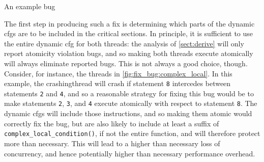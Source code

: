 \begin{sanefig}
  \hspace{-5mm}
  \hspace{-10mm}
  \caption{An example bug}
  \label{fig:fix_bug:complex_local}
\end{sanefig}

The first step in producing such a fix is determining which parts of
the dynamic \glspl{cfg} are to be included in the critical sections.
In principle, it is sufficient to use the entire dynamic \gls{cfg} for
both threads: the analysis of \autoref{sect:derive} will only report
atomicity violation bugs, and so making both threads execute
atomically will always eliminate reported bugs.  This is not always a
good choice, though.  Consider, for instance, the threads in
\autoref{fig:fix_bug:complex_local}.  In this example, the
\gls{crashingthread} will crash if statement \texttt{8} intercedes
between statements \texttt{2} and \texttt{4}, and so a reasonable
strategy for fixing this bug would be to make statements \texttt{2},
\texttt{3}, and \texttt{4} execute atomically with respect to
statement \texttt{8}.  The dynamic \glspl{cfg} will include those
instructions, and so making them atomic would correctly fix the bug,
but are also likely to include at least a suffix of
\texttt{complex\_local\_condition()}, if not the entire function,
and will therefore protect more than necessary. This will lead to a
higher than necessary loss of concurrency, and hence potentially
higher than necessary performance overhead.

